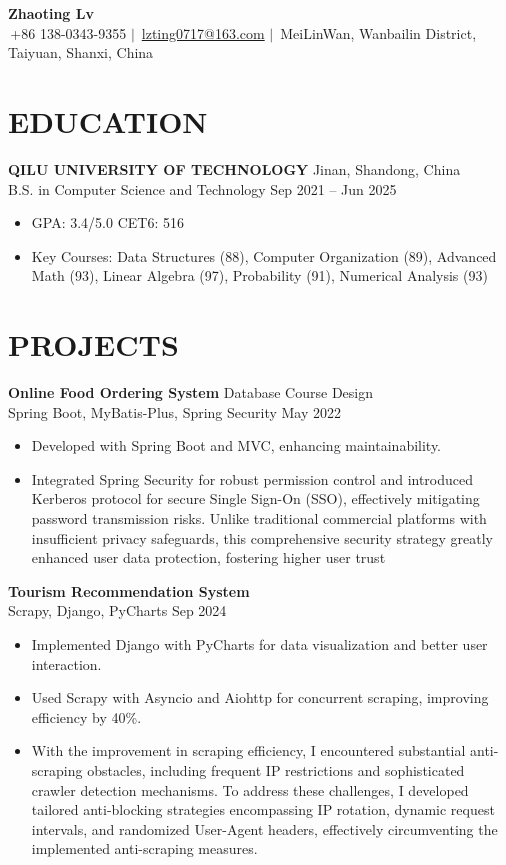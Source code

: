 \documentclass[a4paper,10.5pt]{article}
\newenvironment{resumeList}{\begin{itemize}[leftmargin=*, label=\textbullet{}, itemsep=2pt]}{\end{itemize}}
\newcommand{\resumeItem}[1]{\item\small{#1}}
\newcommand{\resumeEntry}[4]{%
  \textbf{#1} \hfill #2 \\
  \small #3 \hfill #4
  \vspace{-3pt}
}
\begin{document}
\normalsize  

\begin{center}
    {\bfseries\huge Zhaoting Lv} \\[3pt]
    \small
    \faMobile\,+86 138-0343-9355 \quad $|$ \quad 
    \faAt\,\href{mailto:lvzting0717@163.com}{lzting0717@163.com} \quad $|$ \quad 
    \faMapMarker\,MeiLinWan, Wanbailin District, Taiyuan, Shanxi, China
\end{center}

\section{EDUCATION}
\resumeEntry{QILU UNIVERSITY OF TECHNOLOGY}{Jinan, Shandong, China}
{B.S. in Computer Science and Technology}{Sep 2021 -- Jun 2025}
\begin{resumeList}
    \resumeItem{GPA: 3.4/5.0 \quad CET6: 516} 
    \resumeItem{Key Courses: Data Structures (88), Computer Organization (89), Advanced Math (93), Linear Algebra (97), Probability (91), Numerical Analysis (93)}
\end{resumeList}

\section{PROJECTS}
\resumeEntry{Online Food Ordering System}{Database Course Design}
{Spring Boot, MyBatis-Plus, Spring Security}{May 2022}
\begin{resumeList}
    \resumeItem{Developed with Spring Boot and MVC, enhancing maintainability.}
    \resumeItem{Integrated Spring Security for robust permission control and introduced Kerberos protocol for secure Single Sign-On (SSO), effectively mitigating password transmission risks. Unlike traditional commercial platforms with insufficient privacy safeguards, this comprehensive security strategy greatly enhanced user data protection, fostering higher user trust}
\end{resumeList}

\resumeEntry{Tourism Recommendation System}{}{Scrapy, Django, PyCharts}{Sep 2024}
\begin{resumeList}
    \resumeItem{Implemented Django with PyCharts for data visualization and better user interaction.}
    \resumeItem{Used Scrapy with Asyncio and Aiohttp for concurrent scraping, improving efficiency by 40\%.}
    \resumeItem{With the improvement in scraping efficiency, I encountered substantial anti-scraping obstacles, including frequent IP restrictions and sophisticated crawler detection mechanisms. To address these challenges, I developed tailored anti-blocking strategies encompassing IP rotation, dynamic request intervals, and randomized User-Agent headers, effectively circumventing the implemented anti-scraping measures.}
\end{resumeList}
\end{document}

